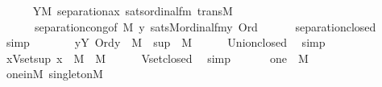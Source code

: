 \begin{isabellebody}
\ \ \ \ \isamarkupfalse%
\ {\isacartoucheopen}Y{\isasymin}M{\isacartoucheclose}\ separation{\isacharunderscore}{\kern0pt}ax\ sats{\isacharunderscore}{\kern0pt}ordinal{\isacharunderscore}{\kern0pt}fm\ trans{\isacharunderscore}{\kern0pt}M\isanewline
\ \ \ \ \ \ separation{\isacharunderscore}{\kern0pt}cong{\isacharbrackleft}{\kern0pt}of\ {\isachardoublequoteopen}{\isacharhash}{\kern0pt}{\isacharhash}{\kern0pt}M{\isachardoublequoteclose}\ {\isachardoublequoteopen}{\isasymlambda}y{\isachardot}{\kern0pt}\ sats{\isacharparenleft}{\kern0pt}M{\isacharcomma}{\kern0pt}ordinal{\isacharunderscore}{\kern0pt}fm{\isacharparenleft}{\kern0pt}{}{\isacharparenright}{\kern0pt}{\isacharcomma}{\kern0pt}{\isacharbrackleft}{\kern0pt}y{\isacharbrackright}{\kern0pt}{\isacharparenright}{\kern0pt}{\isachardoublequoteclose}\ {\isachardoublequoteopen}Ord{\isachardoublequoteclose}{\isacharbrackright}{\kern0pt}\isanewline
\ \ \ \ \ \ separation{\isacharunderscore}{\kern0pt}closed\ \isamarkupfalse%
\ simp\isanewline
\ \ \isamarkupfalse%
\isanewline
\ \ \isamarkupfalse%
\ {\isachardoublequoteopen}{\isasymUnion}\ {\isacharbraceleft}{\kern0pt}y{\isasymin}Y{\isachardot}{\kern0pt}\ Ord{\isacharparenleft}{\kern0pt}y{\isacharparenright}{\kern0pt}{\isacharbraceright}{\kern0pt}\ {\isasymin}\ M{\isachardoublequoteclose}\ {\isacharparenleft}{\kern0pt}\ {\isachardoublequoteopen}{\isacharquery}{\kern0pt}sup\ {\isasymin}\ M{\isachardoublequoteclose}{\isacharparenright}{\kern0pt}\isanewline
\ \ \ \ \isamarkupfalse%
\ Union{\isacharunderscore}{\kern0pt}closed\ \isamarkupfalse%
\ simp\isanewline
\ \ \isamarkupfalse%
\isanewline
\ \ \isamarkupfalse%
\ {\isachardoublequoteopen}{\isacharbraceleft}{\kern0pt}x{\isasymin}Vset{\isacharparenleft}{\kern0pt}{\isacharquery}{\kern0pt}sup{\isacharparenright}{\kern0pt}{\isachardot}{\kern0pt}\ x\ {\isasymin}\ M{\isacharbraceright}{\kern0pt}\ {\isasymin}\ M{\isachardoublequoteclose}\isanewline
\ \ \ \ \isamarkupfalse%
\ Vset{\isacharunderscore}{\kern0pt}closed\ \isamarkupfalse%
\ simp\isanewline
\ \ \isamarkupfalse%
\isanewline
\ \ \isamarkupfalse%
\ {\isachardoublequoteopen}{\isacharbraceleft}{\kern0pt}one{\isacharbraceright}{\kern0pt}\ {\isasymin}\ M{\isachardoublequoteclose}\isanewline
\ \ \ \ \isamarkupfalse%
\ one{\isacharunderscore}{\kern0pt}in{\isacharunderscore}{\kern0pt}M\ singletonM\ \isamarkupfalse%

\end{isabellebody}
